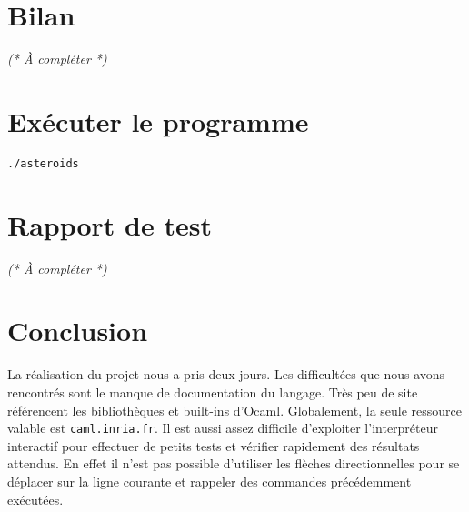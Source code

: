 \documentclass[a4paper,10pt,openany,oneside]{report}
\begin{document}
\section{Bilan}

\textit{(* À compléter *)}

\section{Exécuter le programme}

\texttt{./asteroids}

\section{Rapport de test}

\textit{(* À compléter *)}

\section{Conclusion}

La réalisation du projet nous a pris deux jours. Les difficultées que nous
avons rencontrés sont le manque de documentation du langage. Très peu de site
référencent les bibliothèques et built-ins d'Ocaml. Globalement, la seule
ressource valable est \texttt{caml.inria.fr}. Il est aussi assez difficile
d'exploiter l'interpréteur interactif pour effectuer de petits tests et
vérifier rapidement des résultats attendus. En effet il n'est pas possible
d'utiliser les flèches directionnelles pour se déplacer sur la ligne courante
et rappeler des commandes précédemment exécutées.
\end{document}

